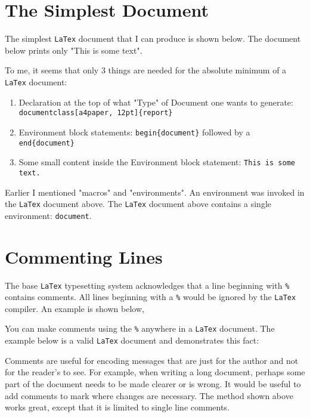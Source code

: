 \documentclass[a4paper, 12pt]{report}
\begin{document}
\begin{center}
\section{The Simplest Document}
\begin{comment}
\end{comment}
The simplest \texttt{LaTex} document that I can produce is shown below. The document below prints only "This is some text".

To me, it seems that only $3$ things are needed for the absolute minimum of a \texttt{LaTex} document:
\begin{enumerate}
\item Declaration at the top of what "Type" of Document one wants to generate: \texttt{documentclass[a4paper, 12pt]\{report\}}  
\item Environment block statements: \texttt{begin\{document\}}  followed by a \texttt{end\{document\}} 
\item Some small content inside the Environment block statement: \texttt{This is some text.} 
\end{enumerate}
Earlier I mentioned "macros" and "environments". An environment was invoked in the \texttt{LaTex} document above. The \texttt{LaTex} document above contains a single environment: \texttt{document}. 

\section{Commenting Lines}
\begin{comment}
\end{comment}
The base \texttt{LaTex} typesetting system acknowledges that a line beginning with \texttt{\%} contains comments. All lines beginning with a \texttt{\%} would be ignored by the \texttt{LaTex} compiler. An example is shown below,

You can make comments using the \texttt{\%} anywhere in a \texttt{LaTex} document. The example below is a valid \texttt{LaTex} document and demonstrates this fact:

Comments are useful for encoding messages that are just for the author and not for the reader's to see. For example, when writing a long document, perhaps some part of the document needs to be made clearer or is wrong. It would be useful to add comments to mark where changes are necessary. The method shown above works great, except that it is limited to single line comments.


\end{center}
\end{document}
